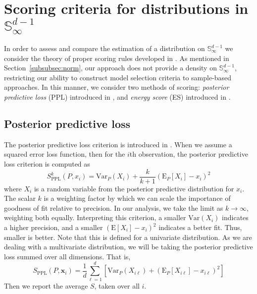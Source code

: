 \section{Scoring criteria for distributions in ${\mathbb S}_\infty^{d-1}$\label{sec:evaluation}}

In order to assess and compare the estimation of a distribution on ${\mathbb S}_\infty^{d-1}$ we consider the theory of proper scoring rules developed in \cite{gneiting2007}.
As mentioned in Section~\ref{subsubsec:norm}, our approach does not provide a density on ${\mathbb S}_{\infty}^{d-1}$, restricting our ability to construct model selection criteria to sample-based approaches.  In this manner, we consider two methods of scoring:  \emph{posterior predictive loss} (PPL) introduced in \cite{gelfand1998}, and \emph{energy score} (ES) introduced in \cite{gneiting2007}.

\subsection{Posterior predictive loss}
The posterior predictive loss criterion is introduced in \cite{gelfand1998}.  When we
  assume a squared error loss function, then for the $i$th observation, the posterior predictive
  loss criterion is computed as
  \begin{equation}
    \label{eq:ppl}
      S_{\text{PPL}}^k\left(P,x_i\right) = \text{Var}_P\left(X_i\right) + \frac{k}{k+1}\left(\text{E}_P\left[X_{i}\right] - x_i\right)^2
  \end{equation}
  where $X_i$ is a random variable from the posterior predictive distribution for $x_i$.  The
  scalar $k$ is a weighting factor by which we can scale the importance of goodness of fit
  relative to precision.  In our analysis, we take the limit as $k\to\infty$, weighting both
  equally.  Interpreting this criterion, a smaller $\text{Var}(X_{i})$ indicates a higher
  precision, and a smaller $(\text{E}[X_{i}] - x_{i})^2$  indicates a better fit.  Thus,
  smaller is better.  Note that this is defined for a univariate distribution.  As we are dealing
  with a multivariate distribution, we will be taking the posterior predictive loss
  summed over all dimensions.  That is,
  \begin{equation}
    \label{eq:ppl2}
      S_{\text{PPL}}\left(P,\bm{x}_i\right) = \frac{1}{d}\sum_{\ell = 1}^d\left[\text{Var}_P\left(X_{i\ell}\right) + \left(\text{E}_P\left[X_{i\ell}\right] - x_{i\ell}\right)^2\right]
  \end{equation}
  Then we report the average $S$, taken over all $i$.

